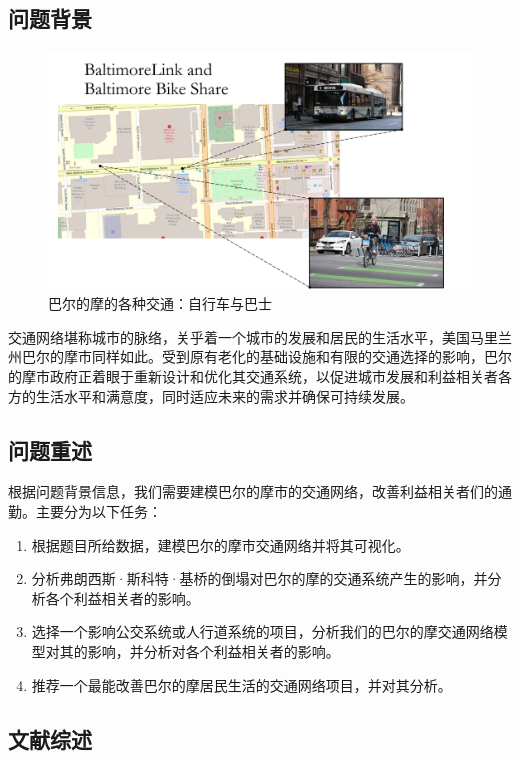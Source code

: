 \documentclass[12pt, a4paper, oneside]{ctexart}
\begin{document}
\subsection{问题背景}

\begin{figure}[H]
    \centering
    \includegraphics[width=\textwidth]{figures/intro.pdf}
    \caption{巴尔的摩的各种交通：自行车与巴士}
    \label{fig:intro}
\end{figure}

交通网络堪称城市的脉络，关乎着一个城市的发展和居民的生活水平，美国马里兰州巴尔的摩市同样如此。受到原有老化的基础设施和有限的交通选择的影响，巴尔的摩市政府正着眼于重新设计和优化其交通系统，以促进城市发展和利益相关者各方的生活水平和满意度，同时适应未来的需求并确保可持续发展。

\subsection{问题重述}
\label{sec:problem}

根据问题背景信息，我们需要建模巴尔的摩市的交通网络，改善利益相关者们的通勤。主要分为以下任务：

\begin{enumerate}
  \item 根据题目所给数据，建模巴尔的摩市交通网络并将其可视化。
  \item 分析弗朗西斯·斯科特·基桥的倒塌对巴尔的摩的交通系统产生的影响，并分析各个利益相关者的影响。
  \item 选择一个影响公交系统或人行道系统的项目，分析我们的巴尔的摩交通网络模型对其的影响，并分析对各个利益相关者的影响。
  \item 推荐一个最能改善巴尔的摩居民生活的交通网络项目，并对其分析。
\end{enumerate}

\subsection{文献综述}
\label{sec:zongshu}
\end{document}
